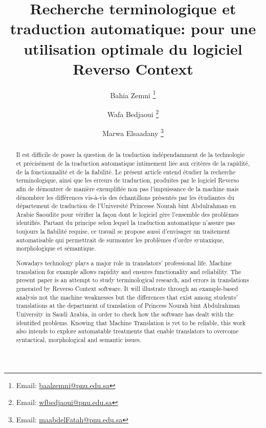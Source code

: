 \documentclass{textolivre}
\title{Recherche terminologique et traduction automatique: pour une utilisation optimale du logiciel Reverso Context}
\author[1]{Bahia Zemni \orcid{0000-0002-6238-7509} \thanks{Email: \url{baalzemni@pnu.edu.sa}}}
\author[1]{Wafa Bedjaoui \orcid{0000-0002-0660-8418} \thanks{Email: \url{wfbedjaoui@pnu.edu.sa}}}
\author[1]{Marwa Elsaadany \orcid{0000-0002-6867-4250} \thanks{Email: \url{maabdelFatah@pnu.edu.sa}}}
\affil[1]{Princess Nourah bint Abdulrahman University, Riyadh, Arabie Saoudite.}
\begin{document}
\maketitle

\begin{polyabstract}
\begin{french}
\begin{abstract}
Il est difficile de poser la question de la traduction indépendamment de la technologie et précisément de la traduction automatique intimement liée aux critères de la rapidité, de la fonctionnalité et de la fiabilité. Le présent article entend étudier la recherche terminologique, ainsi que les erreurs de traduction, produites par le logiciel Reverso afin de démontrer de manière exemplifiée non pas l’impuissance de la machine mais dénombrer les différences vis-à-vis des échantillons présentés par les étudiantes du département de traduction de l’Université Princesse Nourah bint Abdulrahman en Arabie Saoudite pour vérifier la façon dont le logiciel gère l’ensemble des problèmes identifiés. Partant du principe selon lequel la traduction automatique n’assure pas toujours la fiabilité requise, ce travail se propose aussi d’envisager un traitement automatisable qui permettrait de surmonter les problèmes d’ordre syntaxique, morphologique et sémantique.

\end{abstract}
\end{french}

\begin{english}
\begin{abstract}
Nowadays technology plays a major role in translators’ professional life. Machine translation for example allows rapidity and ensures functionality and reliability. The present paper is an attempt to study terminological research, and errors in translations generated by Reverso Context software. It will illustrate through an example-based analysis not the machine weaknesses but the differences that exist among students’ translations at the department of translation of Princess Nourah bint Abdulrahman University in Saudi Arabia, in order to check how the software has dealt with the identified problems. Knowing that Machine Translation is yet to be reliable, this work also intends to explore automatable treatments that enable translators to overcome syntactical, morphological and semantic issues.


\end{abstract}
\end{english}
\end{polyabstract}
\end{document}
